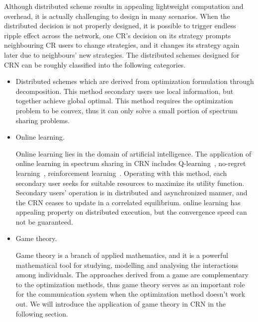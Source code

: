 Although distributed scheme results in appealing lightweight computation and overhead, it is actually challenging to design in many scenarios.
When the distributed decision is not properly designed, it is possible to trigger endless ripple effect across the network, \ie one CR's decision on its strategy prompts neighbouring CR users to change strategies, and it changes its strategy again later due to neighbours' new strategies.
%
The distributed schemes designed for CRN can be roughly classified into the following categories.
\begin{itemize}
\item Distributed schemes which are derived from optimization formulation through decomposition.
This method secondary users use local information, but together achieve global optimal.
This method requires the optimization problem to be convex, thus it can only solve a small portion of spectrum sharing problems.
\item Online learning.

Online learning lies in the domain of artificial intelligence. 
The application of online learning in spectrum sharing in CRN includes Q-learning~\cite{reinforcement_learning_crn_wcnc_2013}, no-regret learning~\cite{hart00correlatedeq,qlearning_huang}, reinforcement learning~\cite{reinforcement_learning_crn_2011}.
Operating with this method, each secondary user seeks for suitable resources to maximize its utility function.
Secondary users' operation is in distributed and asynchronized manner, and the CRN ceases to update in a correlated equilibrium.
online learning has appealing property on distributed execution, but the convergence speed can not be guaranteed.

\item Game theory.

Game theory is a branch of applied mathematics, and it is a powerful mathematical tool for studying, modelling and analysing the interactions among individuals.
The approaches derived from a game are complementary to the optimization methods, thus game theory serves as an important role for the communication system when the optimization method doesn't work out.
We will introduce the application of game theory in CRN in the following section.

\end{itemize}


